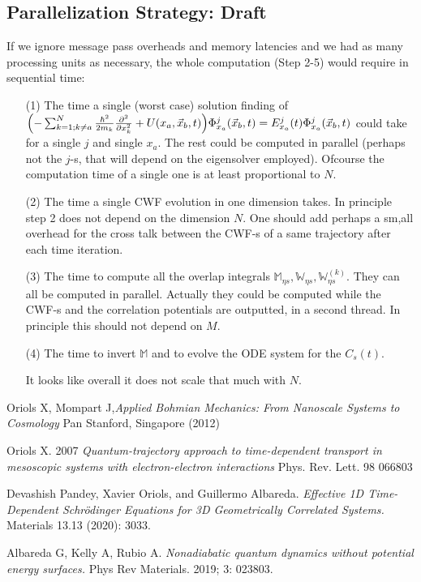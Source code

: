 \documentclass[11pt, a4paper]{article} %
\begin{document}
\subsection{Parallelization Strategy: Draft}
If we ignore message pass overheads and memory latencies and we had as many processing units as necessary, the whole computation (Step 2-5) would require in sequential time:
\begin{enumerate}
\item[(1)] The time a single (worst case) solution finding of $\qty(- \sum_{k=1; k\neq a}^{N} \frac{\hbar^2}{2m_k}\pdv[2]{}{x_k}+U(x_a,\vec{x}_b,t) )\Phi_{x_a}^j(\vec{x}_b,t) = E_{x_a}^j(t)\Phi_{x_a}^j(\vec{x}_b,t)$ could take for a single $j$ and single $x_a$. The rest could be computed in parallel (perhaps not the $j$-s, that will depend on the eigensolver employed). Ofcourse the computation time of a single one is at least proportional to $N$.

\item[(2)] The time a single CWF evolution in one dimension takes. In principle step 2 does not depend on the dimension $N$. One should add perhaps a sm,all overhead for the cross talk between the CWF-s of a same trajectory after each time iteration.
\item[(3)] The time to compute all the overlap integrals $\mathbb{M}_{\eta s}, \mathbb{W}_{\eta s}, \mathbb{W}^{(k)}_{\eta s}$. They can all be computed in parallel. Actually they could be computed while the CWF-s and the correlation potentials are outputted, in a second thread. In principle this should not depend on $M$.

\item[(4)] The time to invert $\mathbb{M}$ and to evolve the ODE system for the $C_s(t)$.

It looks like overall it does not scale that much with $N$.



\end{enumerate}

\begin{thebibliography}{1}

	Oriols X, Mompart J,{\em Applied Bohmian Mechanics: From Nanoscale Systems to Cosmology} Pan Stanford, Singapore (2012)
	
	Oriols X. 2007 {\em Quantum-trajectory approach to time-dependent transport in mesoscopic systems with electron-electron interactions} Phys. Rev. Lett. 98 066803

	Devashish Pandey, Xavier Oriols, and Guillermo Albareda. {\em Effective 1D Time-Dependent Schrödinger Equations for 3D Geometrically Correlated Systems.} Materials 13.13 (2020): 3033.
	
	Albareda G, Kelly A, Rubio A. {\em Nonadiabatic quantum dynamics without potential energy surfaces.} Phys Rev Materials. 2019; 3: 023803. 

	
\end{thebibliography}
\end{document}
